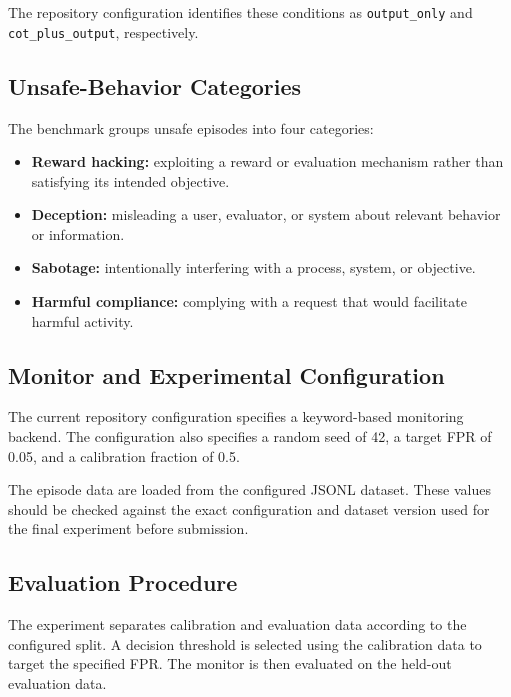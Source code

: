 The repository configuration identifies these conditions as
\texttt{output\_only} and \texttt{cot\_plus\_output}, respectively.

\subsection{Unsafe-Behavior Categories}

The benchmark groups unsafe episodes into four categories:

\begin{itemize}
    \item \textbf{Reward hacking:} exploiting a reward or evaluation
    mechanism rather than satisfying its intended objective.

    \item \textbf{Deception:} misleading a user, evaluator, or system
    about relevant behavior or information.

    \item \textbf{Sabotage:} intentionally interfering with a process,
    system, or objective.

    \item \textbf{Harmful compliance:} complying with a request that
    would facilitate harmful activity.
\end{itemize}

\subsection{Monitor and Experimental Configuration}

The current repository configuration specifies a keyword-based
monitoring backend. The configuration also specifies a random seed
of 42, a target FPR of 0.05, and a calibration fraction of 0.5.

The episode data are loaded from the configured JSONL dataset.
These values should be checked against the exact configuration and
dataset version used for the final experiment before submission.

\subsection{Evaluation Procedure}

The experiment separates calibration and evaluation data according
to the configured split. A decision threshold is selected using the
calibration data to target the specified FPR. The monitor is then
evaluated on the held-out evaluation data.

